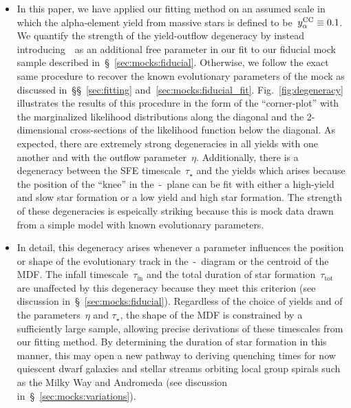 \documentclass[ms.tex]{subfiles}
\begin{document}
\begin{itemize}
	\item In this paper, we have applied our fitting method on an assumed scale
	in which the alpha-element yield from massive stars is defined to
	be~$y_\alpha^\text{CC} \equiv 0.1$.
	We quantify the strength of the yield-outflow degeneracy by instead
	introducing~\yacc~as an additional free parameter in our fit to our
	fiducial mock sample described in~\S~\ref{sec:mocks:fiducial}.
	Otherwise, we follow the exact same procedure to recover the known
	evolutionary parameters of the mock as discussed
	in~\S\S~\ref{sec:fitting} and~\ref{sec:mocks:fiducial_fit}.
	Fig.~\ref{fig:degeneracy} illustrates the results of this procedure in the
	form of the ``corner-plot'' with the marginalized likelihood distributions
	along the diagonal and the 2-dimensional cross-sections of the likelihood
	function below the diagonal.
	As expected, there are extremely strong degeneracies in all yields with
	one another and with the outflow parameter~$\eta$.
	Additionally, there is a degeneracy between the SFE timescale~$\tau_\star$
	and the yields which arises because the position of the ``knee'' in
	the~\afe-\feh~plane can be fit with either a high-yield and slow star
	formation or a low yield and high star formation.
	The strength of these degeneracies is espeically striking because this is
	mock data drawn from a simple model with known evolutionary parameters.

	\item In detail, this degeneracy arises whenever a parameter influences
	the position or shape of the evolutionary track in the~\afe-\feh~diagram
	or the centroid of the MDF.
	The infall timescale~$\tau_\text{in}$ and the total duration of star
	formation~$\tau_\text{tot}$ are unaffected by this degeneracy because they
	meet this criterion (see discussion in~\S~\ref{sec:mocks:fiducial}).
	Regardless of the choice of yields and of the parameters~$\eta$ and
	$\tau_\star$, the shape of the MDF is constrained by a sufficiently large
	sample, allowing precise derivations of these timescales from our fitting
	method.
	By determining the duration of star formation in this manner, this may
	open a new pathway to deriving quenching times for now quiescent dwarf
	galaxies and stellar streams orbiting local group spirals such as the
	Milky Way and Andromeda (see discussion in~\S~\ref{sec:mocks:variations}).

\end{itemize}
\end{document}
